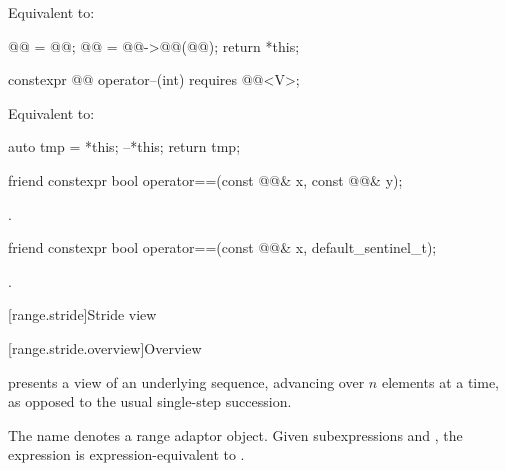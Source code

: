 \begin{itemdescr}
\pnum
\effects
Equivalent to:
\begin{codeblock}
@@ = @@;
@@ = @@->@@(@@);
return *this;
\end{codeblock}
\end{itemdescr}

%
\begin{itemdecl}
constexpr @@ operator--(int) requires @@<V>;
\end{itemdecl}

\begin{itemdescr}
\pnum
\effects
Equivalent to:
\begin{codeblock}
auto tmp = *this;
--*this;
return tmp;
\end{codeblock}
\end{itemdescr}

%
\begin{itemdecl}
friend constexpr bool operator==(const @@& x, const @@& y);
\end{itemdecl}

\begin{itemdescr}
\pnum
\returns
{}.
\end{itemdescr}

%
\begin{itemdecl}
friend constexpr bool operator==(const @@& x, default_sentinel_t);
\end{itemdecl}

\begin{itemdescr}
\pnum
\returns
{}.
\end{itemdescr}

[range.stride]{Stride view}

[range.stride.overview]{Overview}

\pnum
{} presents a view of an underlying sequence,
advancing over $n$ elements at a time,
as opposed to the usual single-step succession.

\pnum
The name  denotes
a range adaptor object.
Given subexpressions  and ,
the expression 
is expression-equivalent to .

